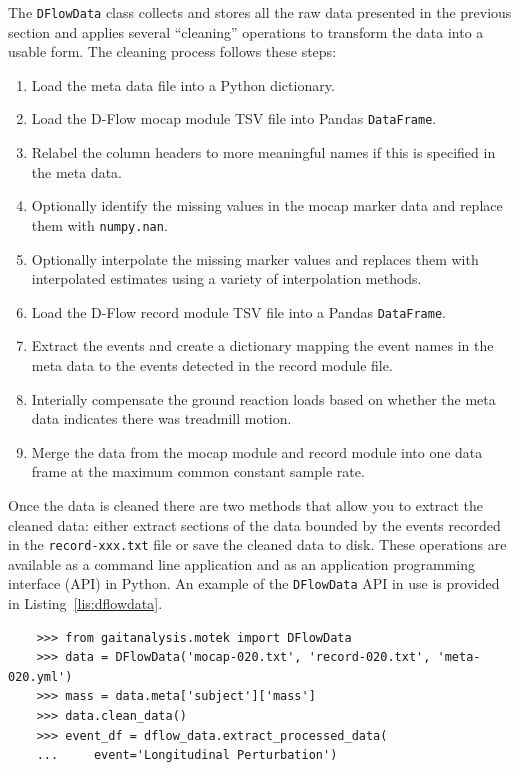 \documentclass[fleqn,10pt]{wlpeerj}
\begin{document}
The \verb|DFlowData| class collects and stores all the raw data presented in
the previous section and applies several ``cleaning'' operations to transform
the data into a usable form. The cleaning process follows these steps:
%
\begin{enumerate}
  \item Load the meta data file into a Python dictionary.
  \item Load the D-Flow mocap module TSV file into Pandas \verb|DataFrame|.
  \item Relabel the column headers to more meaningful names if this is
    specified in the meta data.
  \item Optionally identify the missing values in the mocap marker data and
    replace them with \verb|numpy.nan|.
  \item Optionally interpolate the missing marker values and replaces them
    with interpolated estimates using a variety of interpolation methods.
  \item Load the D-Flow record module TSV file into a Pandas \verb|DataFrame|.
  \item Extract the events and create a dictionary mapping the event names in
    the meta data to the events detected in the record module file.
  \item Interially compensate the ground reaction loads based on whether the
    meta data indicates there was treadmill motion.
  \item Merge the data from the mocap module and record module into one data
    frame at the maximum common constant sample rate.
\end{enumerate}

Once the data is cleaned there are two methods that allow you to extract the
cleaned data: either extract sections of the data bounded by the events
recorded in the \verb|record-xxx.txt| file or save the cleaned data to disk.
These operations are available as a command line application and as an
application programming interface (API) in Python. An example of the
\verb|DFlowData| API in use is provided in Listing~\ref{lis:dflowdata}.
%
\begin{listing}
  \begin{verbatim}
    >>> from gaitanalysis.motek import DFlowData
    >>> data = DFlowData('mocap-020.txt', 'record-020.txt', 'meta-020.yml')
    >>> mass = data.meta['subject']['mass']
    >>> data.clean_data()
    >>> event_df = dflow_data.extract_processed_data(
    ...     event='Longitudinal Perturbation')
  \end{verbatim}
  \cprotect\caption{Python interpreter session showing how one could load a
    trial into memory, extract the subject's mass from the meta data, run the
    data cleaning process, and finally extract a Pandas \verb|DataFrame|
    containing all of the time histories for a specific event in the trial.}
  \label{lis:dflowdata}
\end{listing}
\end{document}
